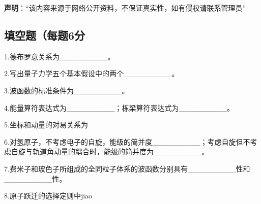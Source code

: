
\textbf{声明}：“该内容来源于网络公开资料，不保证真实性，如有侵权请联系管理员”

\subsection{填空题（每题6分}

1.德布罗意关系为_________。

2.写出量子力学五个基本假设中的两个_________。

3.波函数的标准条件为_________。

4.能量算符表达式为_________；栋梁算符表达式为_________。

5.坐标和动量的对易关系为


6.对氢原子，不考虑电子的自旋，能级的简并度_________；考虑自旋但不考虑自旋与轨道角动量的耦合时，能级的简并度为_________。

7.费米子和玻色子所组成的全同粒子体系的波函数分别具有_________性和_________性。

8.原子跃迁的选择定则中jiao
